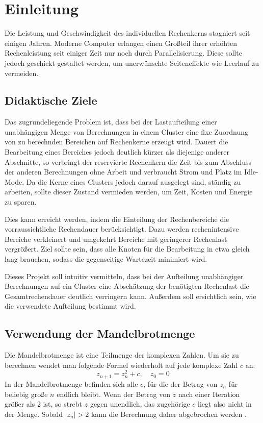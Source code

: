 \section{Einleitung}

Die Leistung und Geschwindigkeit des individuellen Rechenkerns stagniert seit einigen Jahren.
Moderne Computer erlangen einen Großteil ihrer erhöhten Rechenleistung
seit einiger Zeit nur noch durch Parallelisierung.
Diese sollte jedoch geschickt gestaltet werden, um unerwünschte Seiteneffekte
wie Leerlauf zu vermeiden.

\subsection{Didaktische Ziele}

Das zugrundeliegende Problem ist, dass bei der Lastaufteilung einer unabhängigen Menge
von Berechnungen in einem Cluster eine fixe Zuordnung von
zu berechnden Bereichen auf Rechenkerne erzeugt wird. Dauert die Bearbeitung eines Bereiches jedoch deutlich kürzer
als diejenige anderer Abschnitte, so verbringt der reservierte Rechenkern die Zeit bis zum Abschluss der anderen Berechnungen
ohne Arbeit und verbraucht Strom und Platz im Idle-Mode. Da die Kerne eines Clusters jedoch darauf ausgelegt sind, ständig zu arbeiten, sollte dieser Zustand vermieden
werden, um Zeit, Kosten und Energie zu sparen.

Dies kann erreicht werden, indem die Einteilung der Rechenbereiche die vorraussichtliche Rechendauer berücksichtigt.
Dazu werden rechenintensive Bereiche verkleinert und umgekehrt Bereiche mit geringerer Rechenlast vergrößert.
Ziel sollte sein, dass alle Knoten für die Bearbeitung in etwa gleich lang brauchen,
sodass die gegenseitige Wartezeit minimiert wird.

Dieses Projekt soll intuitiv vermitteln, dass bei der Aufteilung unabhängiger
Berechnungen auf ein Cluster eine Abschätzung der benötigten Rechenlast die Gesamtrechendauer deutlich verringern kann.
Außerdem soll ersichtlich sein, wie die verwendete Aufteilung bestimmt wird.

\subsection{Verwendung der Mandelbrotmenge}

Die Mandelbrotmenge ist eine Teilmenge der komplexen Zahlen.
Um sie zu berechnen wendet man folgende Formel wiederholt auf jede komplexe Zahl $c$ an:
\begin{equation}\label{equ:mandelbrot}
	z_{n+1} = z_{n}^2 + c, \quad z_0 = 0
\end{equation}
In der Mandelbrotmenge befinden sich alle $c$, für die der Betrag von $z_n$ für beliebig große $n$ endlich bleibt.
Wenn der Betrag von $z$ nach einer Iteration größer als 2 ist, so strebt $z$ gegen unendlich, das zugehörige $c$ liegt also nicht in der Menge.
Sobald $|z_n| > 2$ kann die Berechnung daher abgebrochen werden \cite{424331}.

